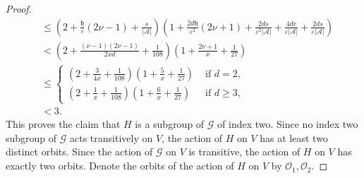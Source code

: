 \documentclass[ALCO,Unicode,published]{cedram}
\newcommand{\calG}{\ensuremath{\mathcal{G}}}
\newcommand{\calO}{\ensuremath{\mathcal{O}}}
\newcommand{\scrA}{\ensuremath{\mathscr{A}}}
\newcommand{\tth}{\ensuremath{\mathfrak{h}}}
\begin{document}
\begin{proof}
\begin{align*}
& 
\leq 
\left(2 + \frac{\tth}{\varepsilon} (2\nu -1) + \frac{s}{|\scrA|} \right) \left( 1 + \frac{2d\tth}{\varepsilon^2}(2\nu+ 1) + \frac{2ds}{\varepsilon^2|\scrA|} + \frac{4dr}{\varepsilon |\scrA|} + \frac{2ds}{\varepsilon |\scrA|}  \right)\\
& 
< 
\left(2 + \frac{(\nu-1)(2\nu -1)}{2xd} +\frac{1}{108} \right) \left( 1 + \frac{2\nu+ 1}{x}+ \frac 1{27}\right)\\
& 
\leq 
\begin{cases}
\left(2 + \frac 3{4x}+ \frac{1}{108}\right) \left( 1 + \frac{5}{x}+ \frac 1{27}\right) & \text{ if } d = 2, \\
\left(2 + \frac 1{x} + \frac{1}{108}\right) \left( 1 + \frac{6}{x}+ \frac 1{27}\right) & \text{ if } d \geq 3,
\end{cases}\\
& 
< 3.
\end{align*}
This proves the claim that $H$ is a subgroup of $\calG$ of index two. Since no index two subgroup of $\calG$ acts transitively on $V$, the action of $H$ on $V$ has at least two distinct orbits. Since the action of $\calG$ on $V$ is transitive, the action of $H$ on $V$ has exactly two orbits. Denote the orbits of the action of $H$ on $V$ by $\calO_1, \calO_2$.  


\end{proof}
\end{document}
